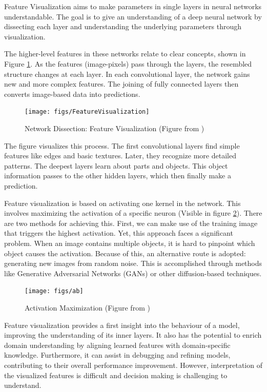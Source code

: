 Feature Visualization aims to make parameters in single layers in neural networks understandable. The goal is to give an understanding of a deep neural network by dissecting each layer and understanding the underlying parameters through visualization.

The higher-level features in these networks relate to clear concepts, shown in Figure \ref{fig:feature-visualization}. As the features (image-pixels) pass through the layers, the resembled structure changes at each layer. In each convolutional layer, the network gains new and more complex features. The joining of fully connected layers then converts image-based data into predictions.
\\
\begin{figure}[H]
	\centering
	\texttt{[image: figs/FeatureVisualization]}
	\caption[Network Dissection: Feature Visualization ]{Network Dissection: Feature Visualization (Figure from \cite{olah2017feature})}
	\label{fig:feature-visualization}
\end{figure}

The figure visualizes this process. The first convolutional layers find simple features like edges and basic textures. Later, they recognize more detailed patterns. The deepest layers learn about parts and objects. This object information passes to the other hidden layers, which then finally make a prediction.

Feature visualization is based on activating one kernel in the network. This involves maximizing the activation of a specific neuron (Visible in figure \ref*{fig:optimization}). There are two methods for achieving this. First, we can make use of the training image that triggers the highest activation. Yet, this approach faces a significant problem. When an image contains multiple objects, it is hard to pinpoint which object causes the activation. Because of this, an alternative route is adopted: generating new images from random noise. This is accomplished through methods like Generative Adversarial Networks (GANs) \cite{goodfellow2014generative} or other diffusion-based techniques\cite{zhang2023survey}.

\begin{figure}[H]
	\centering
	\texttt{[image: figs/ab]}
	\caption[Activation Maximization]{Activation Maximization (Figure from \cite{olah2017feature})}
	\label{fig:optimization}
\end{figure}

Feature visualization provides a first insight into the behaviour of a model, improving the understanding of its inner layers. It also has the potential to enrich domain understanding by aligning learned features with domain-specific knowledge. Furthermore, it can assist in debugging and refining models, contributing to their overall performance improvement. However, interpretation of the visualized features is difficult and decision making is challenging to understand.

